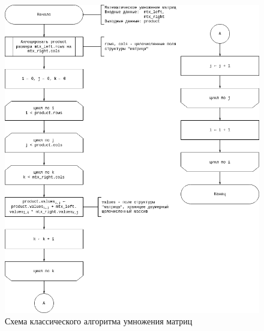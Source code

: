 \begin{figure}[H]
	\centering
	\includegraphics[width=\linewidth]{assets/mtx-alg.drawio.png}
	\caption{Схема классического алгоритма умножения матриц}
	\label{fig:alg}
\end{figure}

